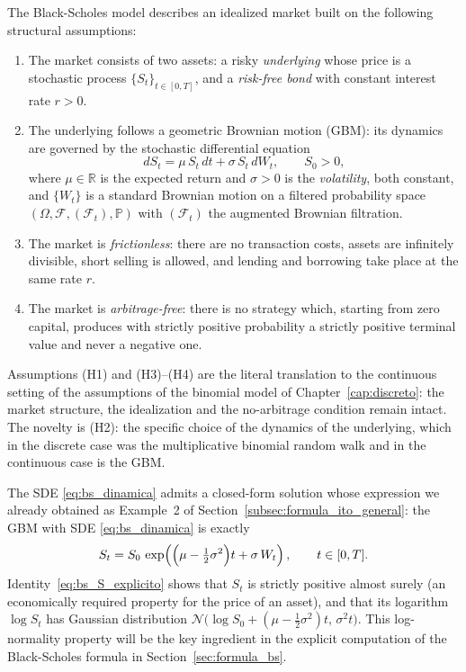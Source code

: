 \documentclass[11pt,a4paper,oneside]{report}
\theoremstyle{plain}
\theoremstyle{definition}
\theoremstyle{remark}
\newcommand{\R}{\mathbb{R}}
\newcommand{\PP}{\mathbb{P}}
\newcommand{\F}{\mathcal{F}}
\newcommand{\1}{\mathbf{1}}
\begin{document}
The Black-Scholes model
describes an idealized market built on the following structural
assumptions:

\begin{enumerate}[label=\textnormal{(H\arabic*)}, leftmargin=*]
  \item The market consists of two assets: a risky \emph{underlying}
        whose price is a stochastic process $\{S_t\}_{t \in [0, T]}$,
        and a \emph{risk-free bond} with constant interest rate
        $r > 0$.
  \item The underlying follows a geometric Brownian motion (GBM): its
        dynamics are governed by the stochastic differential equation
        \begin{equation}\label{eq:bs_dinamica}
          dS_t = \mu\, S_t\, dt + \sigma\, S_t\, dW_t,
          \qquad S_0 > 0,
        \end{equation}
        where $\mu \in \R$ is the expected return and $\sigma > 0$ is
        the \emph{volatility}, both constant, and $\{W_t\}$ is a
        standard Brownian motion on a filtered probability space
        $(\Omega, \F, (\F_t), \PP)$ with $(\F_t)$ the augmented
        Brownian filtration.
  \item The market is \emph{frictionless}: there are no transaction
        costs, assets are infinitely divisible, short selling is
        allowed, and lending and borrowing take place at the same
        rate $r$.
  \item The market is \emph{arbitrage-free}: there is no strategy
        which, starting from zero capital, produces with strictly
        positive probability a strictly positive terminal value and
        never a negative one.
\end{enumerate}

Assumptions (H1) and (H3)–(H4) are the literal translation to the
continuous setting of the assumptions of the binomial model of
Chapter~\ref{cap:discreto}: the market structure, the idealization
and the no-arbitrage condition remain intact. The novelty is (H2):
the specific choice of the dynamics of the underlying, which in the
discrete case was the multiplicative binomial random walk and in the
continuous case is the GBM.

The SDE
\eqref{eq:bs_dinamica} admits a closed-form solution whose expression
we already obtained as Example~2 of
Section~\ref{subsec:formula_ito_general}: the GBM with SDE
\eqref{eq:bs_dinamica} is exactly
\begin{equation}\label{eq:bs_S_explicito}
  S_t = S_0\, \exp\!\left(\Bigl(\mu - \tfrac{1}{2}\sigma^2\Bigr) t
                          + \sigma\, W_t\right),
  \qquad t \in [0, T].
\end{equation}
Identity~\eqref{eq:bs_S_explicito} shows that $S_t$ is strictly
positive almost surely (an economically required property for the
price of an asset), and that its logarithm $\log S_t$ has Gaussian
distribution
$\mathcal{N}\bigl(\log S_0 + (\mu - \tfrac{1}{2}\sigma^2) t,\, \sigma^2 t\bigr)$.
This log-normality property will be the key ingredient in the
explicit computation of the Black-Scholes formula in
Section~\ref{sec:formula_bs}.
\end{document}
